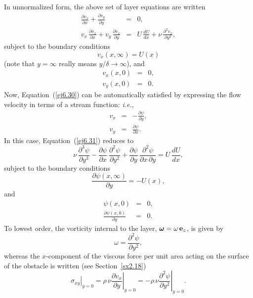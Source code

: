 In unnormalized form, the above set of layer equations are written
\begin{eqnarray}
\frac{\partial v_x}{\partial x} + \frac{\partial v_y}{\partial y} &=& 0,\label{ej6.30}\\[0.5ex]
v_x\,\frac{\partial v_x}{\partial x} + v_y\,\frac{\partial v_x}{\partial y} &=& U\,\frac{dU}{dx}
+ \nu\,\frac{\partial^2 v_x}{\partial y^2},\label{ej6.31}
\end{eqnarray}
subject to the boundary conditions
\begin{equation}
v_x(x,\infty)= U(x)
\end{equation}
(note that $y=\infty$ really means $y/\delta\rightarrow\infty$), and
\begin{eqnarray}
v_x(x,0) &=& 0,\\[0.5ex]
v_y(x,0) &=&0.
\end{eqnarray}
Now, Equation~(\ref{ej6.30}) can be automatically satisfied by expressing the flow velocity in terms of a
stream function: {\em i.e.}, 
\begin{eqnarray}
v_x &=&-\frac{\partial\psi}{\partial y},\\[0.5ex]
v_y &=&\frac{\partial\psi}{\partial x}.
\end{eqnarray}
In this case, Equation~(\ref{ej6.31}) reduces to
\begin{equation}\label{ej6.38}
\nu\,\frac{\partial^3\psi}{\partial y^3}-\frac{\partial\psi}{\partial x}\,\frac{\partial^2\psi}{\partial y^2} + \frac{\partial \psi}{\partial y}\,\frac{\partial^2\psi}{\partial
x \,\partial y}= U\,\frac{dU}{dx},
\end{equation}
subject to the boundary conditions
\begin{equation}\label{ej6.32}
\frac{\partial\psi(x,\infty)}{\partial y}=-U(x),
\end{equation}
 and
\begin{eqnarray}
\psi(x,0) &=&0,\\[0.5ex]
\frac{\partial\psi(x,0)}{\partial y}&=&0.\label{ej6.35}
\end{eqnarray}
 To lowest order, the vorticity internal to the layer, $\mbox{\boldmath$\omega$}=\omega\,{\bf e}_z$, is given by
\begin{equation}\label{ej6.43}
\omega = \frac{\partial^2\psi}{\partial y^2},
\end{equation}
whereas the $x$-component of the  viscous force per unit area acting on the surface of the obstacle is written (see Section~\ref{sx2.18})
\begin{equation}\label{ej6.44}
\left.\sigma_{xy}\right|_{y=0} = \rho\,\nu\left.\frac{\partial v_x}{\partial y}\right|_{y=0} = -\rho\,\nu\left.\frac{\partial^2\psi}{\partial y^2}\right|_{y=0}.
\end{equation}

